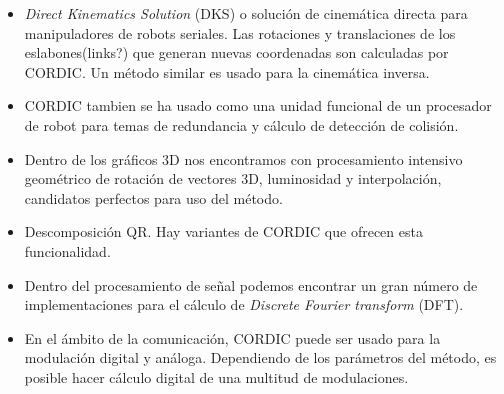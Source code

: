 \begin{itemize}
  \item \textit{Direct Kinematics Solution} (DKS) o solución de cinemática directa para manipuladores de robots seriales. Las rotaciones y translaciones de los eslabones(links?) que generan nuevas coordenadas son calculadas por CORDIC. Un método similar es usado para la cinemática inversa.
  
  \item CORDIC tambien se ha usado como una unidad funcional de un procesador de robot para temas de redundancia y cálculo de detección de colisión.
  
  \item Dentro de los gráficos 3D nos encontramos con procesamiento intensivo geométrico de rotación de vectores 3D, luminosidad y interpolación, candidatos perfectos para uso del método.
  
  \item Descomposición QR. Hay variantes de CORDIC que ofrecen esta funcionalidad.
  
  \item  Dentro del procesamiento de señal podemos encontrar un gran número de implementaciones para el cálculo de \textit{Discrete Fourier transform} (DFT).
  
  \item En el ámbito de la comunicación, CORDIC puede ser usado para la modulación digital y análoga. Dependiendo de los parámetros del método, es posible hacer cálculo digital de una multitud de modulaciones.
\end{itemize}

























